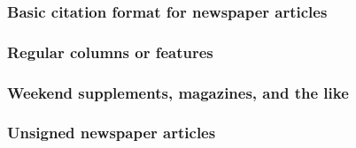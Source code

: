 \documentclass[11pt,letterpaper,oneside]{article}
\begin{document}
\begin{citebib}
\item \cite{marx2015}
\item \cite{wallraff2008}
\item \cite{gourmet2000}
\end{citebib}

\subsubsection{Basic citation format for newspaper articles}

\begin{citebib}
\item \cite{editorial1990}
\item \cite{royko1992}
\item \cite{forester2000}
\item \cite{samenow2016}
\end{citebib}

\setcounter{subsubsection}{194}
\subsubsection{Regular columns or features}

\begin{citebib}
\item \cite{jaffe2015}
\end{citebib}

\setcounter{subsubsection}{196}
\subsubsection{Weekend supplements, magazines, and the like}

\begin{citebib}
\item \cite[48]{ghansah2015}
\end{citebib}

\setcounter{subsubsection}{198}
\subsubsection{Unsigned newspaper articles}

\begin{citebib}
\item \cite{nytimes2002}
\end{citebib}
\end{document}
